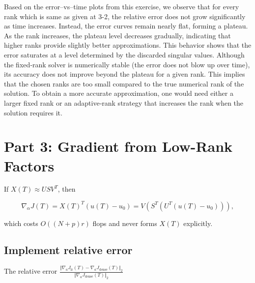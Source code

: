 \documentclass[11pt]{report}
\begin{document}
Based on the error–vs–time plots from this exercise, we observe that for every rank which is same as given at 3-2,  the relative error does not grow significantly as time increases. Instead, the error curves remain nearly flat, forming a plateau. As the rank increases, the plateau level decreases gradually, indicating that higher ranks provide slightly better approximations. This behavior shows that the error saturates at a level determined by the discarded singular values.
\vspace{0.8em}
Although the fixed‑rank solver is numerically stable (the error does not blow up over time), its accuracy does not improve beyond the plateau for a given rank. This implies that the chosen ranks are too small compared to the true numerical rank of the solution. To obtain a more accurate approximation, one would need either a larger fixed rank or an adaptive‑rank strategy that increases the rank when the solution requires it.


\section{Part 3: Gradient from Low-Rank Factors}

If \(X(T) \approx U S V^T\), then


\[
\nabla_\alpha J(T)
= X(T)^T (u(T)-u_0)
= V \left( S^T \left( U^T (u(T)-u_0) \right) \right),
\]


which costs \(O((N+p)r)\) flops and never forms \(X(T)\) explicitly.

\subsection{Implement relative error}

The relative error $\frac{\Vert \nabla_{a} J_{\text{lr}}(T) - \nabla_{a} J_{\text{dense}}(T) \Vert_{2}}{\Vert \nabla_{a} J_{\text{dense}}(T) \Vert_{2}}$ 
\end{document}
